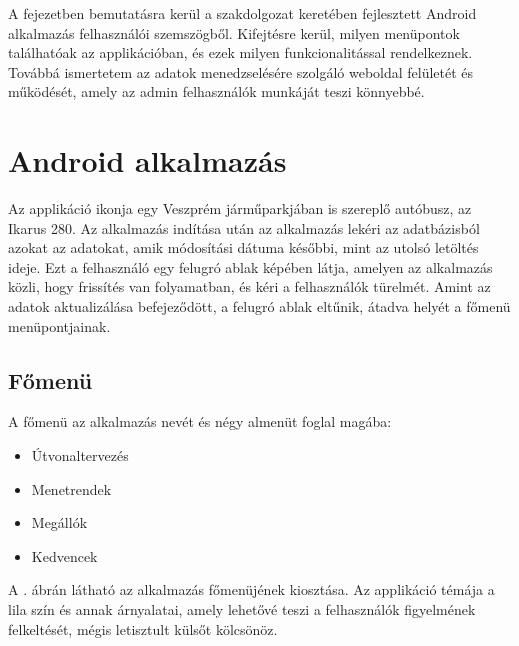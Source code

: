 
A fejezetben bemutatásra kerül a szakdolgozat keretében fejlesztett Android alkalmazás felhasználói szemszögből.
Kifejtésre kerül, milyen menüpontok találhatóak az applikációban, és ezek milyen funkcionalitással rendelkeznek.
Továbbá ismertetem az adatok menedzselésére szolgáló weboldal felületét és működését, amely az admin felhasználók munkáját teszi könnyebbé.

\section{Android alkalmazás}
\label{androidapp}
Az applikáció ikonja egy Veszprém járműparkjában is szereplő autóbusz, az Ikarus 280.
Az alkalmazás indítása után az alkalmazás lekéri az adatbázisból azokat az adatokat, amik módosítási dátuma későbbi, mint az utolsó letöltés ideje.
Ezt a felhasználó egy felugró ablak képében látja, amelyen az alkalmazás közli, hogy frissítés van folyamatban, és kéri a felhasználók türelmét.
Amint az adatok aktualizálása befejeződött, a felugró ablak eltűnik, átadva helyét a főmenü menüpontjainak.

\subsection{Főmenü}
\label{fomenu}
A főmenü az alkalmazás nevét és négy almenüt foglal magába:
\begin{itemize}
	\item Útvonaltervezés
	\item Menetrendek
	\item Megállók
	\item Kedvencek
\end{itemize}

A . ábrán látható az alkalmazás főmenüjének kiosztása. 
Az applikáció témája a lila szín és annak árnyalatai, amely lehetővé teszi a felhasználók figyelmének felkeltését, mégis letisztult külsőt kölcsönöz.

